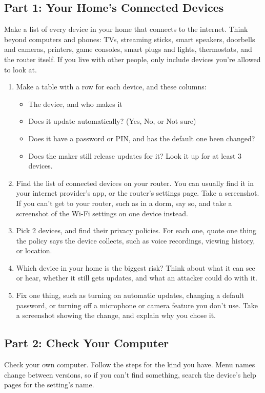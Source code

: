 \documentclass[12pt]{article}
\begin{document}
\subsection*{Part 1: Your Home's Connected Devices}
Make a list of every device in your home that connects to the internet. Think beyond computers and phones: TVs, streaming sticks, smart speakers, doorbells and cameras, printers, game consoles, smart plugs and lights, thermostats, and the router itself. If you live with other people, only include devices you're allowed to look at.
\begin{enumerate}
    \item Make a table with a row for each device, and these columns:
    \begin{itemize}
        \item The device, and who makes it
        \item Does it update automatically? (Yes, No, or Not sure)
        \item Does it have a password or PIN, and has the default one been changed?
        \item Does the maker still release updates for it? Look it up for at least 3 devices.
    \end{itemize}
    \item Find the list of connected devices on your router. You can usually find it in your internet provider's app, or the router's settings page. Take a screenshot. If you can't get to your router, such as in a dorm, say so, and take a screenshot of the Wi-Fi settings on one device instead.
    \item Pick 2 devices, and find their privacy policies. For each one, quote one thing the policy says the device collects, such as voice recordings, viewing history, or location.
    \item Which device in your home is the biggest risk? Think about what it can see or hear, whether it still gets updates, and what an attacker could do with it.
    \item Fix one thing, such as turning on automatic updates, changing a default password, or turning off a microphone or camera feature you don't use. Take a screenshot showing the change, and explain why you chose it.
\end{enumerate}

\subsection*{Part 2: Check Your Computer}
Check your own computer. Follow the steps for the kind you have. Menu names change between versions, so if you can't find something, search the device's help pages for the setting's name.
\end{document}
